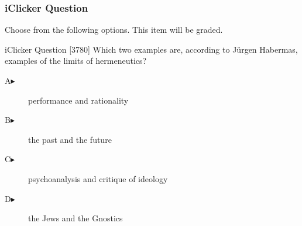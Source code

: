 \begin{frame}
  \frametitle{iClicker Question}
Choose from the following options. This item will be graded.
\begin{block}{iClicker Question}
[3780] Which two examples are, according to J{\"u}rgen Habermas, examples of
the limits of hermeneutics?
\end{block}
\begin{description}
\item[A\hspace{.2in}$\blacktriangleright$] performance and rationality
\item[B\hspace{.2in}$\blacktriangleright$] the past and the future
\item[C\hspace{.2in}$\blacktriangleright$] psychoanalysis and critique of ideology
\item[D\hspace{.2in}$\blacktriangleright$] the Jews and the Gnostics
\end{description}
\end{frame}
